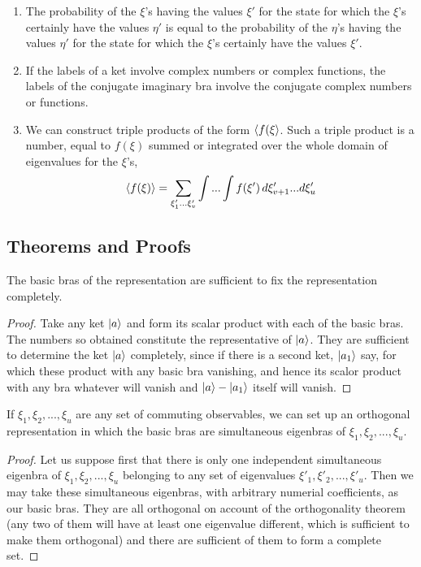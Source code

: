 \begin{enumerate}
	\item The probability of the $\xi$'s having the values $\xi'$ for the state for which the $\xi$'s certainly have the values $\eta'$ is equal to the probability of the $\eta$'s having the values $\eta'$ for the state for which the $\xi$'s certainly have the values $\xi'$.

	\item If the labels of a ket involve complex numbers or complex functions, the labels of the conjugate imaginary bra involve the conjugate complex numbers or functions.

	\item We can construct triple products of the form $\langle f(\xi \rangle$. Such a triple product is a number, equal to $f(\xi)$ summed or integrated over the whole domain of eigenvalues for the $\xi$'s,
	\begin{equation}
	\langle f(\xi) \rangle= \sum_{\xi'_1...\xi'_v}\int...\int f(\xi')\,d\xi'_{v+1}...d\xi'_{u}
	\end{equation}


\end{enumerate}

\subsection{Theorems and Proofs}
\begin{theorem}
The basic bras of the representation are sufficient to fix the representation completely.
\end{theorem}

\begin{proof}
Take any ket $| a \rangle$ and form its scalar product with each of the basic bras. The numbers so obtained constitute the representative of $| a \rangle$. They are sufficient to determine the ket $| a \rangle$ completely, since if there is a second ket, $| a_1 \rangle$ say, for which these product with any basic bra vanishing, and hence its scalor product with any bra whatever will vanish and $| a \rangle-| a_1 \rangle$ itself will vanish.
\end{proof}

\begin{theorem}
If $\xi_1,\xi_2,...,\xi_u$ are any set of commuting observables, we can set up an orthogonal representation in which the basic bras are simultaneous eigenbras of $\xi_1,\xi_2,...,\xi_u$.
\end{theorem}

\begin{proof}
Let us suppose first that there is only one independent simultaneous eigenbra of $\xi_1,\xi_2,...,\xi_u$ belonging to any set of eigenvalues $\xi'_1,\xi'_2,...,\xi'_u$. Then we may take these simultaneous eigenbras, with arbitrary numerial coefficients, as our basic bras. They are all orthogonal on account of the orthogonality theorem (any two of them will have at least one eigenvalue different, which is sufficient to make them orthogonal) and there are sufficient of them to form a complete set.
\end{proof}

